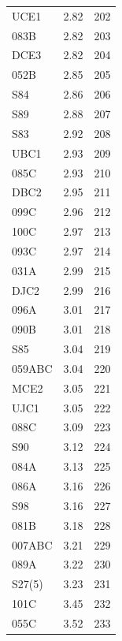\begin{longtable}{lrr}
  UCE1 & 2.82 & 202 \\
  083B & 2.82 & 203 \\
  DCE3 & 2.82 & 204 \\
  052B & 2.85 & 205 \\
  S84 & 2.86 & 206 \\
  S89 & 2.88 & 207 \\
  S83 & 2.92 & 208 \\
  UBC1 & 2.93 & 209 \\
  085C & 2.93 & 210 \\
  DBC2 & 2.95 & 211 \\
  099C & 2.96 & 212 \\
  100C & 2.97 & 213 \\
  093C & 2.97 & 214 \\
  031A & 2.99 & 215 \\
  DJC2 & 2.99 & 216 \\
  096A & 3.01 & 217 \\
  090B & 3.01 & 218 \\
  S85 & 3.04 & 219 \\
  059ABC & 3.04 & 220 \\
  MCE2 & 3.05 & 221 \\
  UJC1 & 3.05 & 222 \\
  088C & 3.09 & 223 \\
  S90 & 3.12 & 224 \\
  084A & 3.13 & 225 \\
  086A & 3.16 & 226 \\
  S98 & 3.16 & 227 \\
  081B & 3.18 & 228 \\
  007ABC & 3.21 & 229 \\
  089A & 3.22 & 230 \\
  S27(5) & 3.23 & 231 \\
  101C & 3.45 & 232 \\
  055C & 3.52 & 233 \\
\end{longtable}
